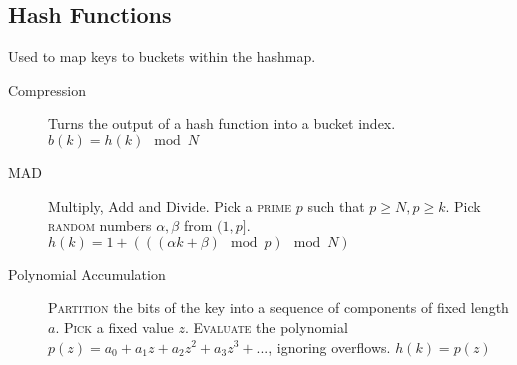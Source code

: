 \documentclass[landscape]{cheat}
\begin{document}
\begin{multicols}{3}
\subsection{Hash Functions}
Used to map keys to buckets within the hashmap.
\begin{description}
    \item[Compression] Turns the output of a hash function into a bucket index.
        $b(k) = h(k) \mod N$
    \item[MAD] Multiply, Add and Divide.
        Pick a \textsc{prime} $p$ such that $p \geq N, p \geq k$.
        Pick \textsc{random} numbers $\alpha, \beta$ from $(1, p]$.
        $h(k) = 1 + (((\alpha k + \beta) \mod p) \mod N)$
    \item[Polynomial Accumulation] \textsc{Partition} the bits of the key into a sequence of components of fixed length $a$.
        \textsc{Pick} a fixed value $z$.
        \textsc{Evaluate} the polynomial $p(z) = a_0 + a_1z + a_2z^2 + a_3z^3+...$, ignoring overflows.
        $h(k) = p(z)$

\end{description}

\end{multicols}
\end{document}

